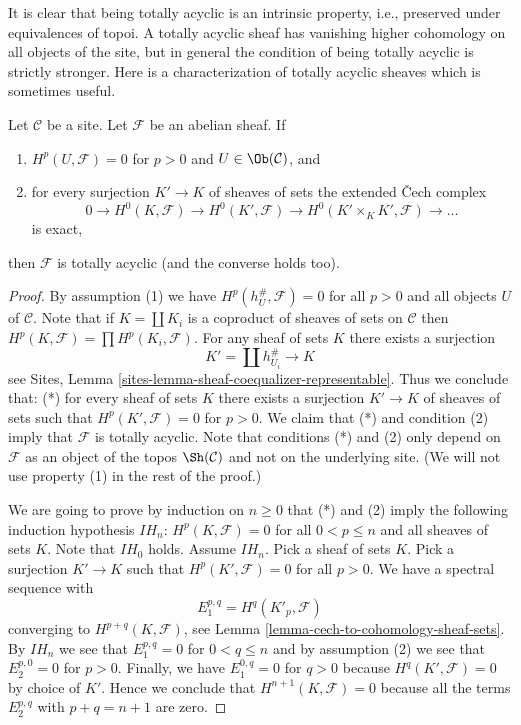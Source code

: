 \noindent
It is clear that being totally acyclic is an intrinsic property, i.e.,
preserved under equivalences of topoi.
A totally acyclic sheaf has vanishing higher cohomology on all objects
of the site, but in general the condition of being totally acyclic
is strictly stronger.
Here is a characterization of totally acyclic sheaves which is sometimes useful.

\begin{lemma}
\label{lemma-characterize-limp}
Let $\mathcal{C}$ be a site. Let $\mathcal{F}$ be an abelian sheaf. If
\begin{enumerate}
\item $H^p(U, \mathcal{F}) = 0$ for $p > 0$ and $U \in \Ob(\mathcal{C})$, and
\item for every surjection $K' \to K$ of sheaves of sets the
extended {\v C}ech complex
$$
0 \to H^0(K, \mathcal{F}) \to H^0(K', \mathcal{F}) \to
H^0(K' \times_K K', \mathcal{F}) \to \ldots
$$
is exact,
\end{enumerate}
then $\mathcal{F}$ is totally acyclic (and the converse holds too).
\end{lemma}

\begin{proof}
By assumption (1) we have $H^p(h_U^\#, \mathcal{F}) = 0$ for all
$p > 0$ and all objects $U$ of $\mathcal{C}$. Note that if
$K = \coprod K_i$ is a coproduct of sheaves of sets on $\mathcal{C}$
then $H^p(K, \mathcal{F}) = \prod H^p(K_i, \mathcal{F})$.
For any sheaf of sets $K$ there exists a surjection
$$
K' = \coprod h_{U_i}^\# \longrightarrow K
$$
see Sites, Lemma \ref{sites-lemma-sheaf-coequalizer-representable}.
Thus we conclude that: (*) for every sheaf of sets $K$ there exists a
surjection $K' \to K$ of sheaves of sets such that $H^p(K', \mathcal{F}) = 0$
for $p > 0$. We claim that (*) and condition (2) imply that $\mathcal{F}$
is totally acyclic.
Note that conditions (*) and (2) only depend on $\mathcal{F}$ as an
object of the topos $\Sh(\mathcal{C})$ and not on the underlying site.
(We will not use property (1) in the rest of the proof.)

\medskip\noindent
We are going to prove by induction on $n \geq 0$ that (*) and (2)
imply the following induction hypothesis $IH_n$:
$H^p(K, \mathcal{F}) = 0$ for all $0 < p \leq n$ and
all sheaves of sets $K$. Note that $IH_0$ holds. Assume $IH_n$. Pick
a sheaf of sets $K$. Pick a surjection $K' \to K$ such that
$H^p(K', \mathcal{F}) = 0$ for all $p > 0$. We have a
spectral sequence with
$$
E_1^{p, q} = H^q(K'_p, \mathcal{F})
$$
converging to $H^{p + q}(K, \mathcal{F})$, see
Lemma \ref{lemma-cech-to-cohomology-sheaf-sets}.
By $IH_n$ we see that $E_1^{p, q} = 0$ for $0 < q \leq n$ and by
assumption (2) we see that $E_2^{p, 0} = 0$ for $p > 0$. Finally, we have
$E_1^{0, q} = 0$ for $q > 0$ because $H^q(K', \mathcal{F}) = 0$ by
choice of $K'$. Hence we conclude that $H^{n + 1}(K, \mathcal{F}) = 0$
because all the terms $E_2^{p, q}$ with $p + q = n + 1$ are zero.
\end{proof}







